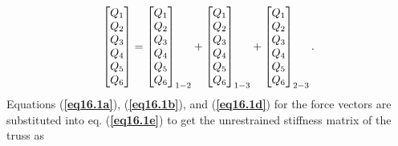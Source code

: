 \documentclass{AeroStructure-ERJohnson}
\begin{document}
\begin{example}
\begin{align}
\left[\begin{array}{@{}l@{}}Q_{1} \\Q_{2} \\Q_{3} \\Q_{4} \\Q_{5} \\Q_{6}\end{array}\right]=\left[\begin{array}{@{}l@{}}Q_{1} \\Q_{2} \\Q_{3} \\Q_{4} \\Q_{5} \\Q_{6}\end{array}\right]_{1-2}+\left[\begin{array}{@{}l@{}}Q_{1} \\Q_{2} \\Q_{3} \\Q_{4} \\Q_{5} \\Q_{6}\end{array}\right]_{1-3}+\left[\begin{array}{@{}l@{}}Q_{1} \\Q_{2} \\Q_{3} \\Q_{4} \\Q_{5} \\Q_{6}\end{array}\right]_{2-3}.
\end{align}
Equations (\textbf{\ref{eq16.1a}}), (\textbf{\ref{eq16.1b}}), and (\textbf{\ref{eq16.1d}}) for the force vectors are substituted into eq. (\textbf{\ref{eq16.1e}}) to get the unrestrained stiffness matrix of the truss as
\begin{align}\label{eq16.1f}\tag{f}

\end{align}
\end{example}
\end{document}
